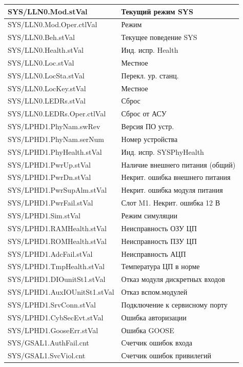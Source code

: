 \begin{longtable}{|>{\raggedright\arraybackslash}m{}|>{\raggedright\arraybackslash}m{}|}
SYS/LLN0.Mod.stVal & Текущий режим SYS \\
\hline
SYS/LLN0.Mod.Oper.ctlVal & Режим \\
\hline
SYS/LLN0.Beh.stVal & Текущее поведение SYS \\
\hline
SYS/LLN0.Health.stVal & Инд. испр. Health \\
\hline
SYS/LLN0.Loc.stVal & Местное \\
\hline
SYS/LLN0.LocSta.stVal & Перекл. ур. станц. \\
\hline
SYS/LLN0.LocKey.stVal & Местное \\
\hline
SYS/LLN0.LEDRs.stVal & Сброс \\
\hline
SYS/LLN0.LEDRs.Oper.ctlVal & Сброс от АСУ \\
\hline
SYS/LPHD1.PhyNam.swRev & Версия ПО устр. \\
\hline
SYS/LPHD1.PhyNam.serNum & Номер устройства \\
\hline
SYS/LPHD1.PhyHealth.stVal & Инд. испр. SYSPhyHealth \\
\hline
SYS/LPHD1.PwrUp.stVal & Наличие внешнего питания (общий) \\
\hline
SYS/LPHD1.PwrDn.stVal & Некрит. ошибка внешнего питания \\
\hline
SYS/LPHD1.PwrSupAlm.stVal & Некрит. ошибка модуля питания \\
\hline
SYS/LPHD1.PwrFail.stVal & Слот M1. Некрит. ошибка 12 В \\
\hline
SYS/LPHD1.Sim.stVal & Режим симуляции \\
\hline
SYS/LPHD1.RAMHealth.stVal & Неисправность ОЗУ ЦП \\
\hline
SYS/LPHD1.ROMHealth.stVal & Неисправность ПЗУ ЦП \\
\hline
SYS/LPHD1.AdcFail.stVal & Неисправность АЦП \\
\hline
SYS/LPHD1.TmpHealth.stVal & Температура ЦП в норме \\
\hline
SYS/LPHD1.DIOunitSt1.stVal & Отказ модуля дискретных входов \\
\hline
SYS/LPHD1.AuxIOUnitSt1.stVal & Отказ вспом.модулей \\
\hline
SYS/LPHD1.SrvConn.stVal & Подключение к сервисному порту \\
\hline
SYS/LPHD1.CybSecEvt.stVal & Ошибка авторизации \\
\hline
SYS/LPHD1.GooseErr.stVal & Ошибка GOOSE \\
\hline
SYS/GSAL1.AuthFail.cnt & Счетчик ошибок входа \\
\hline
SYS/GSAL1.SvcViol.cnt & Счетчик ошибок привилегий \\

\end{longtable}
